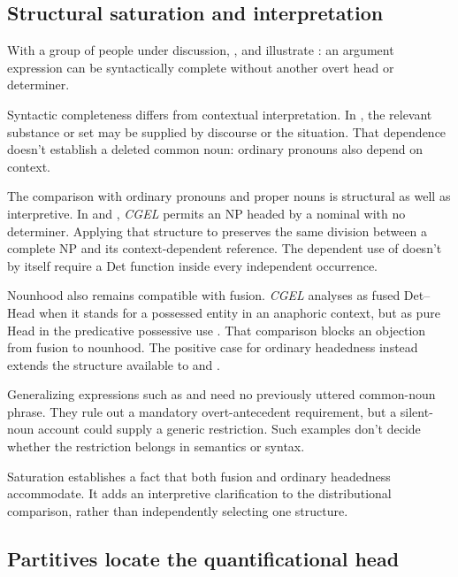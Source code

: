 \documentclass[12pt]{article}
\begin{document}
\subsection{Structural saturation and interpretation}

With a group of people under discussion, ,  and  illustrate : an argument expression can be syntactically complete without another overt head or determiner.

Syntactic completeness differs from contextual interpretation. In , the relevant substance or set may be supplied by discourse or the situation. That dependence doesn't establish a deleted common noun: ordinary pronouns also depend on context.

The comparison with ordinary pronouns and proper nouns is structural as well as interpretive. In  and , \textit{CGEL} permits an NP headed by a nominal with no determiner. Applying that structure to  preserves the same division between a complete NP and its context-dependent reference. The dependent use of  doesn't by itself require a Det function inside every independent occurrence.

Nounhood also remains compatible with fusion. \textit{CGEL} analyses  as fused Det--Head when it stands for a possessed entity in an anaphoric context, but as pure Head in the predicative possessive use  \citep[410--411]{huddleston2002}. That comparison blocks an objection from fusion to nounhood. The positive case for ordinary headedness instead extends the structure available to  and .

Generalizing expressions such as  and  need no previously uttered common-noun phrase. They rule out a mandatory overt-antecedent requirement, but a silent-noun account could supply a generic restriction. Such examples don't decide whether the restriction belongs in semantics or syntax.

Saturation establishes a fact that both fusion and ordinary headedness accommodate. It adds an interpretive clarification to the distributional comparison, rather than independently selecting one structure.

\subsection{Partitives locate the quantificational head}
\end{document}
